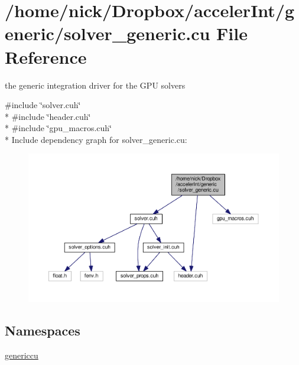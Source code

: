 \hypertarget{solver__generic_8cu}{}\section{/home/nick/\+Dropbox/acceler\+Int/generic/solver\+\_\+generic.cu File Reference}
\label{solver__generic_8cu}


the generic integration driver for the G\+PU solvers  


{\ttfamily \#include \char`\"{}solver.\+cuh\char`\"{}}\\*
{\ttfamily \#include \char`\"{}header.\+cuh\char`\"{}}\\*
{\ttfamily \#include \char`\"{}gpu\+\_\+macros.\+cuh\char`\"{}}\\*
Include dependency graph for solver\+\_\+generic.\+cu\+:
\nopagebreak
\begin{figure}[H]
\begin{center}
\leavevmode
\includegraphics[width=350pt]{solver__generic_8cu__incl}
\end{center}
\end{figure}
\subsection*{Namespaces}
\begin{DoxyCompactItemize}
\item 
 \hyperlink{namespacegenericcu}{genericcu}
\end{DoxyCompactItemize}
